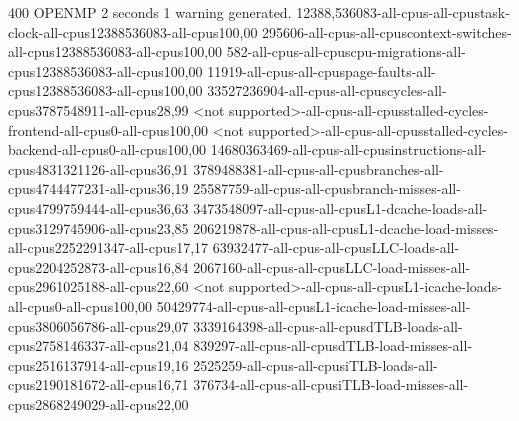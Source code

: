 
400
OPENMP
2 seconds
1 warning generated.
12388,536083-all-cpus-all-cpustask-clock-all-cpus12388536083-all-cpus100,00
295606-all-cpus-all-cpuscontext-switches-all-cpus12388536083-all-cpus100,00
582-all-cpus-all-cpuscpu-migrations-all-cpus12388536083-all-cpus100,00
11919-all-cpus-all-cpuspage-faults-all-cpus12388536083-all-cpus100,00
33527236904-all-cpus-all-cpuscycles-all-cpus3787548911-all-cpus28,99
<not supported>-all-cpus-all-cpusstalled-cycles-frontend-all-cpus0-all-cpus100,00
<not supported>-all-cpus-all-cpusstalled-cycles-backend-all-cpus0-all-cpus100,00
14680363469-all-cpus-all-cpusinstructions-all-cpus4831321126-all-cpus36,91
3789488381-all-cpus-all-cpusbranches-all-cpus4744477231-all-cpus36,19
25587759-all-cpus-all-cpusbranch-misses-all-cpus4799759444-all-cpus36,63
3473548097-all-cpus-all-cpusL1-dcache-loads-all-cpus3129745906-all-cpus23,85
206219878-all-cpus-all-cpusL1-dcache-load-misses-all-cpus2252291347-all-cpus17,17
63932477-all-cpus-all-cpusLLC-loads-all-cpus2204252873-all-cpus16,84
2067160-all-cpus-all-cpusLLC-load-misses-all-cpus2961025188-all-cpus22,60
<not supported>-all-cpus-all-cpusL1-icache-loads-all-cpus0-all-cpus100,00
50429774-all-cpus-all-cpusL1-icache-load-misses-all-cpus3806056786-all-cpus29,07
3339164398-all-cpus-all-cpusdTLB-loads-all-cpus2758146337-all-cpus21,04
839297-all-cpus-all-cpusdTLB-load-misses-all-cpus2516137914-all-cpus19,16
2525259-all-cpus-all-cpusiTLB-loads-all-cpus2190181672-all-cpus16,71
376734-all-cpus-all-cpusiTLB-load-misses-all-cpus2868249029-all-cpus22,00

